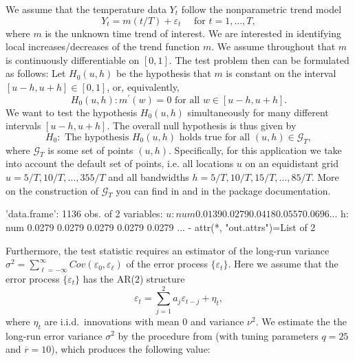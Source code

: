 \documentclass[a4paper]{article}
\begin{document}
We assume that the temperature data $Y_{t}$ follow the nonparametric trend model
\begin{equation*}
Y_{t} = m(t/T) + \varepsilon_t \quad \text{ for } t = 1, \ldots, T,
\end{equation*}
where $m$ is the unknown time trend of interest. We are interested in identifying local increases/decreases of the trend function $m$. We assume throughout that $m$ is continuously differentiable on $[0,1]$. The test problem then can be formulated as follows: Let $H_0(u,h)$ be the hypothesis that $m$ is constant on the interval $[u-h,u+h] \in [0, 1]$, or, equivalently,
\[ H_0(u,h): m^\prime(w) = 0 \text { for all } w \in [u-h,u+h]. \]
We want to test the hypothesis $H_0(u,h)$ simultaneously for many different intervals $[u-h,u+h]$. The overall null hypothesis is thus given by
\[ H_0: \text{ The hypothesis } H_0(u,h) \text{ holds true for all } (u,h) \in \mathcal{G}_T, \]
where $\mathcal{G}_T$ is some set of points $(u,h)$. Specifically, for this application we take into account the default set of points, i.e. all locations $u$ on an equidistant grid \linebreak $u = 5/T, 10/T, \ldots, 355/T$ and all bandwidths $h=5/T, 10/T, 15/T,\ldots, 85/T$. More on the construction of $\mathcal{G}_T$ you can find in \cite{KhismatullinaVogt2020} and in the package documentation.

\begin{Schunk}
\begin{Soutput}
'data.frame':	1136 obs. of  2 variables:
 $ u: num  0.0139 0.0279 0.0418 0.0557 0.0696 ...
 $ h: num  0.0279 0.0279 0.0279 0.0279 0.0279 ...
 - attr(*, "out.attrs")=List of 2
\end{Soutput}
\end{Schunk}

Furthermore, the test statistic requires an estimator of the long-run variance \linebreak $\sigma^2 = \sum_{\ell=-\infty}^{\infty} Cov(\varepsilon_0, \varepsilon_{\ell})$ of the error process $\{ \varepsilon_t \}$. Here we assume that the error process $\{ \varepsilon_t \}$ has the AR($2$) structure
\begin{equation*}
\varepsilon_t = \sum_{j=1}^{2} a_j \varepsilon_{t-j} + \eta_t,
\end{equation*}
where $\eta_t$ are i.i.d.\ innovations with mean $0$ and variance $\nu^2$. We estimate the the long-run error variance $\sigma^2$ by the procedure from \cite{KhismatullinaVogt2020} (with tuning parameters $q = 25$ and $ = 10$), which produces the following value:
\end{document}

